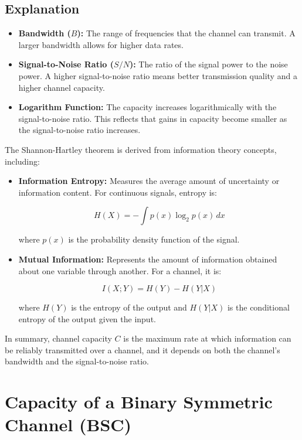 \documentclass{article}
\begin{document}
\subsection{Explanation}

\begin{itemize}
    \item \textbf{Bandwidth (\(B\)):} The range of frequencies that the channel can transmit. A larger bandwidth allows for higher data rates.
    
    \item \textbf{Signal-to-Noise Ratio (\(S/N\)):} The ratio of the signal power to the noise power. A higher signal-to-noise ratio means better transmission quality and a higher channel capacity.
    
    \item \textbf{Logarithm Function:} The capacity increases logarithmically with the signal-to-noise ratio. This reflects that gains in capacity become smaller as the signal-to-noise ratio increases.
\end{itemize}

The Shannon-Hartley theorem is derived from information theory concepts, including:

\begin{itemize}
    \item \textbf{Information Entropy:} Measures the average amount of uncertainty or information content. For continuous signals, entropy is:

    \[
    H(X) = - \int p(x) \log_2 p(x) \, dx
    \]

    where \(p(x)\) is the probability density function of the signal.
    
    \item \textbf{Mutual Information:} Represents the amount of information obtained about one variable through another. For a channel, it is:

    \[
    I(X;Y) = H(Y) - H(Y|X)
    \]

    where \(H(Y)\) is the entropy of the output and \(H(Y|X)\) is the conditional entropy of the output given the input.
\end{itemize}

In summary, channel capacity \(C\) is the maximum rate at which information can be reliably transmitted over a channel, and it depends on both the channel's bandwidth and the signal-to-noise ratio.
\section{Capacity of a Binary Symmetric Channel (BSC)}
\end{document}

